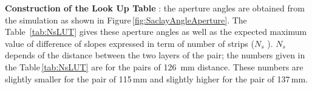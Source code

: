 %

\textbf{Construction of the Look Up Table} : the aperture angles are obtained from the simulation as shown in Figure\,\ref{fig:SaclayAngleAperture}. The Table~\ref{tab:NsLUT} gives these aperture angles as well as the expected maximum value of difference of slopes expressed in term of number of strips  ($N_{s}$ ).
$N_{s}$ depends of the distance between the two layers of the pair; the numbers given in the Table\,\ref{tab:NsLUT} are for the pairs of 126~mm distance. These numbers are slightly smaller for the pair of 115\,mm and slightly higher for the pair of 137\,mm.

